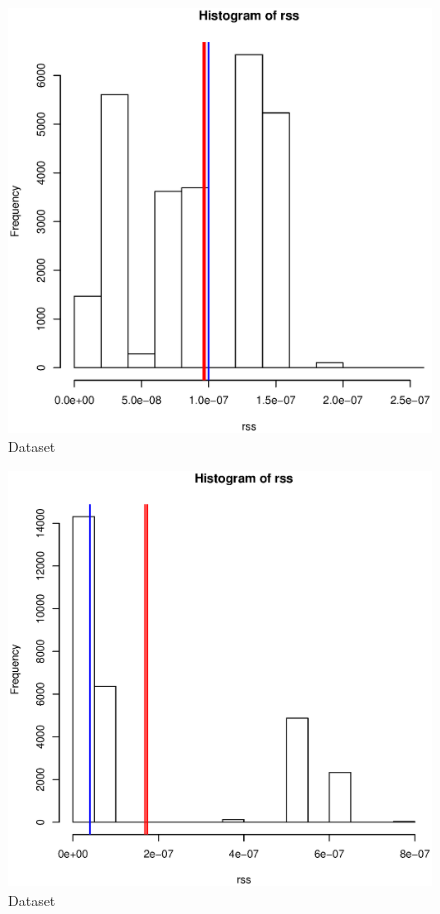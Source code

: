 \documentclass [12 pt , a4paper ] {article}
\begin{document}
\begin{figure}[!ht]
  \centering
  \includegraphics[scale=0.2]{link-35-channel-64.eps}
  \caption{Dataset}
  \label{fig:Dataset}
\end{figure}
\begin{figure}[!ht]
  \centering
  \includegraphics[scale=0.2]{link-35-channel-165.eps}
  \caption{Dataset}
  \label{fig:Dataset}
\end{figure}

\printbibliography
\end{document}
